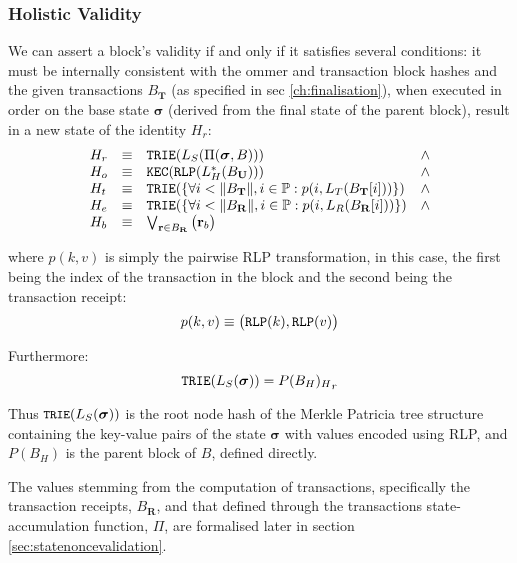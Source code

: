 \documentclass[9pt,oneside]{amsart}
\begin{document}
\begin{multicols}{2}
\subsubsection{Holistic Validity}

We can assert a block's validity if and only if it satisfies several conditions: it must be internally consistent with the ommer and transaction block hashes and the given transactions $B_\mathbf{T}$ (as specified in sec \ref{ch:finalisation}), when executed in order on the base state $\boldsymbol{\sigma}$ (derived from the final state of the parent block), result in a new state of the identity $H_r$:
\begin{equation}
\begin{array}[t]{lclc}
H_r &\equiv& \mathtt{\small TRIE}(L_S(\Pi(\boldsymbol{\sigma}, B))) & \wedge \\
H_o &\equiv& \mathtt{\small KEC}(\mathtt{\small RLP}(L_H^*(B_\mathbf{U}))) & \wedge \\
H_t &\equiv& \mathtt{\small TRIE}(\{\forall i < \lVert B_\mathbf{T} \rVert, i \in \mathbb{P}: p(i, L_T(B_\mathbf{T}[i]))\}) & \wedge \\
H_e &\equiv& \mathtt{\small TRIE}(\{\forall i < \lVert B_\mathbf{R} \rVert, i \in \mathbb{P}: p(i, L_R(B_\mathbf{R}[i]))\}) & \wedge \\
H_b &\equiv& \bigvee_{\mathbf{r} \in B_\mathbf{R}} \big( \mathbf{r}_b \big)
\end{array}
\end{equation}

where $p(k, v)$ is simply the pairwise RLP transformation, in this case, the first being the index of the transaction in the block and the second being the transaction receipt:
\begin{equation}
p(k, v) \equiv \big( \mathtt{\small RLP}(k), \mathtt{\small RLP}(v) \big)
\end{equation}

Furthermore:
\begin{equation}
\mathtt{\small TRIE}(L_S(\boldsymbol{\sigma})) = {P(B_H)_H}_r
\end{equation}

Thus $\texttt{\small TRIE}(L_S(\boldsymbol{\sigma}))$ is the root node hash of the Merkle Patricia tree structure containing the key-value pairs of the state $\boldsymbol{\sigma}$ with values encoded using RLP, and $P(B_H)$ is the parent block of $B$, defined directly.

The values stemming from the computation of transactions, specifically the transaction receipts, $B_\mathbf{R}$, and that defined through the transactions state-accumulation function, $\Pi$, are formalised later in section \ref{sec:statenoncevalidation}.


\end{multicols}
\end{document}
